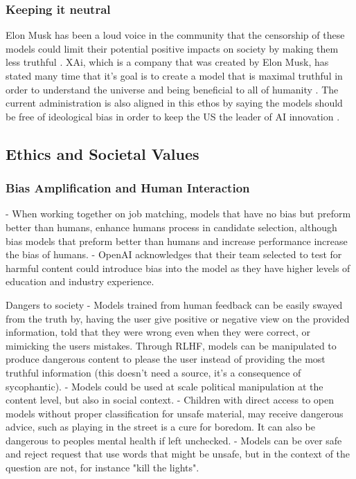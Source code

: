 \subsubsection{Keeping it neutral}

Elon Musk has been a loud voice in the community that the censorship of these models could limit their potential positive impacts on society by making them less truthful \citep{perrigo_elon_2023}. XAi, which is a company that was created by Elon Musk, has stated many time that it's goal is to create a model that is maximal truthful in order to understand the universe and being beneficial to all of humanity \citep{xai_series_2024}. The current administration is also aligned in this ethos by saying the models should be free of ideological bias in order to keep the US the leader of AI innovation \citep{whitehouse_removing_2025}.

\subsection{Ethics and Societal Values}

\subsubsection{Bias Amplification and Human Interaction}

\citep{peng_investigations_2022} - When working together on job matching, models that have no bias but preform better than humans, enhance humans process in candidate selection, although bias models that preform better than humans and increase performance increase the bias of humans.
\citep{openai_gpt_4_2023} - OpenAI acknowledges that their team selected to test for harmful content could introduce bias into the model as they have higher levels of education and industry experience.

Dangers to society
\citep{sharma_towards_2023} - Models trained from human feedback can be easily swayed from the truth by, having the user give positive or negative view on the provided information, told that they were wrong even when they were correct, or mimicking the users mistakes. Through RLHF, models can be manipulated to produce dangerous content to please the user instead of providing the most truthful information (this doesn't need a source, it's a consequence of sycophantic).
\citep{shevlane_model_2023} - Models could be used at scale political manipulation at the content level, but also in social context.
\citep{mei_mitigating_2022, mei_assert_2023} - Children with direct access to open models without proper classification for unsafe material, may receive dangerous advice, such as playing in the street is a cure for boredom. It can also be dangerous to peoples mental health if left unchecked.
\citep{rottger_xstest_2024} - Models can be over safe and reject request that use words that might be unsafe, but in the context of the question are not, for instance "kill the lights".

